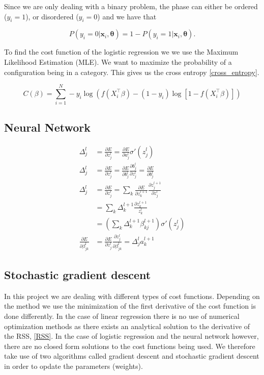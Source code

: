 \documentclass[a4paper,12pt, english]{article}
\begin{document}
Since we are only dealing with a binary problem, the phase can either be ordered ($y_i = 1$), or disordered ($y_i = 0$) and we have that 

\begin{equation*}
P(y_i = 0|\mathbf{x}_i,\mathbf{\theta}) = 1 - P(y_i = 1|\mathbf{x}_i,\mathbf{\theta}).
\end{equation*}

To find the cost function of the logistic regression we we use the Maximum Likelihood Estimation (MLE). We want to maximize the probability of a configuration being in a category. This gives us the cross entropy \ref{cross_entropy}.

\begin{equation} \label{cross_entropy}
C(\beta) = \sum_{i=1}^N -y_i \log (f(X_i^\top \beta) - (1 - y_i) \log [1 - f(X_i^\top \beta)])
\end{equation}

\subsection{Neural Network}

\begin{align}
\Delta_j^l &= \frac{\partial E}{\partial z_j^l} = \frac{\partial E}{\partial a_j^l} \sigma'(z_j^l) \\
\Delta_j^l &= \frac{\partial E}{\partial z_j^l} = \frac{\partial E}{\partial b_j^l} \frac{\partial b_j^l}{\partial z_j^l} = \frac{\partial E}{\partial b_j^l} \\
\Delta_j^l &= \frac{\partial E}{\partial z_j^l} = \sum_k \frac{\partial E}{\partial z_k^{l+1}} \frac{\partial z_j^{l+1}}{\partial z_j^l} \\
&= \sum_k \Delta_k^{l+1} \frac{\partial z_k^{l+1}}{z_k^l} \\
&= \left( \sum_k \Delta_k^{l+1} \beta_{kj}^{l+1} \right) \sigma'(z_j^l) \\
\frac{\partial E}{\partial \beta_{jk}^l} &= \frac{\partial E}{\partial z_j^l} \frac{\partial z_j^l}{\partial \beta_{jk}^l} = \Delta_j^l a_k^{l+1} 
\end{align}



\subsection{Stochastic gradient descent}

In this project we are dealing with different types of cost functions. Depending on the method we use the minimization of the first derivative of the cost function is done differently. In the case of linear regression there is no use of numerical optimization methods as there exists an analytical solution to the derivative of the RSS, \ref{RSS}. In the case of logistic regression and the neural network however, there are no closed form solutions to the cost functions being used. We therefore take use of two algorithms called gradient descent and stochastic gradient descent in order to opdate the parameters (weights).
\end{document}
